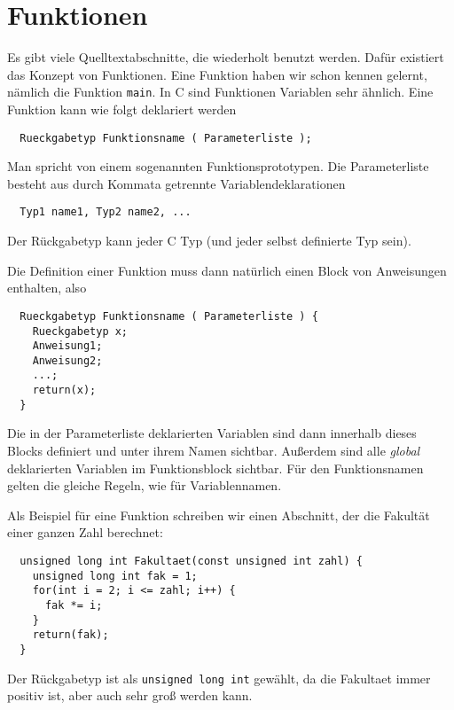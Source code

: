\section{Funktionen}

Es gibt viele Quelltextabschnitte, die wiederholt benutzt werden.
Dafür existiert das Konzept von Funktionen.
Eine Funktion haben wir schon kennen gelernt, nämlich die Funktion \verb|main|. 
In C sind Funktionen Variablen sehr ähnlich.
Eine Funktion kann wie folgt deklariert werden
\begin{lstlisting}
  Rueckgabetyp Funktionsname ( Parameterliste );
\end{lstlisting}
Man spricht von einem sogenannten Funktionsprototypen.
Die Parameterliste besteht aus durch Kommata getrennte Variablendeklarationen
\begin{lstlisting}
  Typ1 name1, Typ2 name2, ...
\end{lstlisting}
Der Rückgabetyp kann jeder C Typ (und jeder selbst definierte Typ sein).

Die Definition einer Funktion muss dann natürlich einen Block von Anweisungen enthalten, also
\begin{lstlisting}
  Rueckgabetyp Funktionsname ( Parameterliste ) {
    Rueckgabetyp x;
    Anweisung1;
    Anweisung2;
    ...;
    return(x);
  }
\end{lstlisting}
Die in der Parameterliste deklarierten Variablen sind dann innerhalb dieses Blocks definiert und unter ihrem Namen sichtbar.
Außerdem sind alle \emph{global} deklarierten Variablen im Funktionsblock sichtbar.
Für den Funktionsnamen gelten die gleiche Regeln, wie für Variablennamen.

Als Beispiel für eine Funktion schreiben wir einen Abschnitt, der die Fakultät einer ganzen Zahl berechnet:
\begin{lstlisting}
  unsigned long int Fakultaet(const unsigned int zahl) {
    unsigned long int fak = 1;
    for(int i = 2; i <= zahl; i++) {
      fak *= i;
    }
    return(fak);
  }
\end{lstlisting}
Der Rückgabetyp ist als \verb|unsigned long int| gewählt, da die Fakultaet immer positiv ist, aber auch sehr groß werden kann.
\endinput
